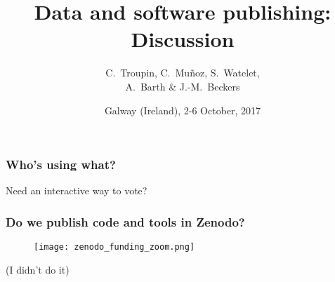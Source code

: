 


\title{Data and software publishing:\\
Discussion}
\author[C.~Troupin]{C.~Troupin, C.~Muñoz, S.~Watelet,\\ A.~Barth \& J.-M.~Beckers}
\date{Galway (Ireland), 2-6 October, 2017}
  



\begin{frame}
\maketitle
\end{frame}

\begin{frame}
\frametitle{Who's using what?}

Need an interactive way to vote?

\end{frame}

\begin{frame}
\frametitle{Do we publish code and tools in Zenodo?}

\begin{figure}
\texttt{[image: zenodo\_funding\_zoom.png]}
\end{figure}

(I didn't do it)
\end{frame}



